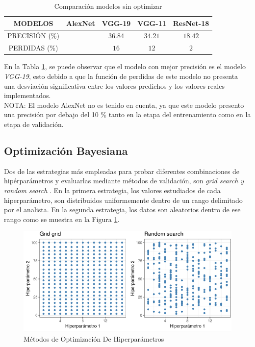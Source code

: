 \begin{table}[ht]
	\centering
	\begin{tabular}{|c|c|c|c|c|}
		\hline
		MODELOS & AlexNet & VGG-19 & VGG-11 & ResNet-18 \\
		\hline
		PRECISIÓN (\%) &  & $$36.84$$ & $$34.21$$ & $$18.42$$ \\
		\hline
		PERDIDAS (\%) &  & $$16$$ & $$12$$ & $$2$$ \\
		\hline
	\end{tabular}	
	\caption{Comparación modelos sin optimizar}
	\label{table:compasin}
\end{table}	

En la Tabla \ref{table:compasin}, se puede observar que el modelo con mejor precisión es el modelo \textit{VGG-19}, esto debido a que la función de perdidas de este modelo no presenta una desviación significativa entre los valores predichos y los valores reales implementados.
\\
NOTA: El modelo AlexNet no es tenido en cuenta, ya que este modelo presento una precisión por debajo del 10 \% tanto en la etapa del entrenamiento como en la etapa de validación.


\newpage
\subsection{Optimización Bayesiana}

Dos de las estrategias más empleadas para probar diferentes combinaciones de hipérparámetros y evaluarlas mediante métodos de validación, son \textit{grid search y random search} \cite{liashchynskyi2019grid}. En la primera estrategia, los valores estudiados de cada hiperparámetro, son distribuidos uniformemente dentro de un rango delimitado por el analista. En la segunda estrategia, los datos son aleatorios dentro de ese rango como se muestra en la Figura \ref{fig:Hiperparámetros grid search y random search}.

\begin{figure}[ht]
	\centering
	\includegraphics[scale=0.6]{Figs/121.png}
	\caption{Métodos de Optimización De Hiperparámetros}
	\label{fig:Hiperparámetros grid search y random search}
\end{figure}


